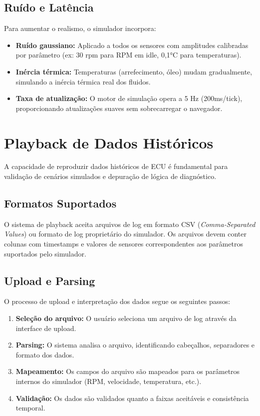 \subsection{Ruído e Latência}

Para aumentar o realismo, o simulador incorpora:

\begin{itemize}
    \item \textbf{Ruído gaussiano:} Aplicado a todos os sensores com amplitudes calibradas por parâmetro (ex: 30 rpm para RPM em idle, 0,1°C para temperaturas).
    \item \textbf{Inércia térmica:} Temperaturas (arrefecimento, óleo) mudam gradualmente, simulando a inércia térmica real dos fluidos.
    \item \textbf{Taxa de atualização:} O motor de simulação opera a 5 Hz (200ms/tick), proporcionando atualizações suaves sem sobrecarregar o navegador.
\end{itemize}

\section{Playback de Dados Históricos}
\label{sec:playback}

A capacidade de reproduzir dados históricos de ECU é fundamental para validação de cenários simulados e depuração de lógica de diagnóstico.

\subsection{Formatos Suportados}

O sistema de playback aceita arquivos de log em formato CSV (\textit{Comma-Separated Values}) ou formato de log proprietário do simulador. Os arquivos devem conter colunas com timestamps e valores de sensores correspondentes aos parâmetros suportados pelo simulador.

\subsection{Upload e Parsing}

O processo de upload e interpretação dos dados segue os seguintes passos:

\begin{enumerate}
    \item \textbf{Seleção do arquivo:} O usuário seleciona um arquivo de log através da interface de upload.
    \item \textbf{Parsing:} O sistema analisa o arquivo, identificando cabeçalhos, separadores e formato dos dados.
    \item \textbf{Mapeamento:} Os campos do arquivo são mapeados para os parâmetros internos do simulador (RPM, velocidade, temperatura, etc.).
    \item \textbf{Validação:} Os dados são validados quanto a faixas aceitáveis e consistência temporal.
\end{enumerate}

